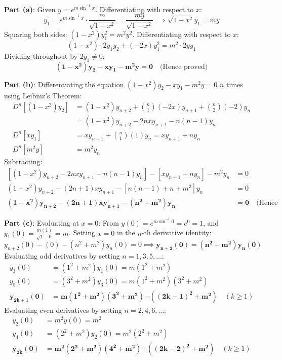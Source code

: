 \begin{solutionbox}
\textbf{Part (a)}: Given $y = e^{m\sin^{-1}x}$. Differentiating with respect to $x$:
\begin{equation*}
    y_1 = e^{m\sin^{-1}x} \cdot \frac{m}{\sqrt{1-x^2}} = \frac{m y}{\sqrt{1-x^2}} \implies \sqrt{1-x^2} y_1 = m y
\end{equation*}
Squaring both sides: $(1-x^2)y_1^2 = m^2 y^2$. Differentiating with respect to $x$:
\begin{equation*}
    (1-x^2) \cdot 2y_1 y_2 + (-2x)y_1^2 = m^2 \cdot 2y y_1
\end{equation*}
Dividing throughout by $2y_1 \ne 0$:
\begin{equation*}
    \mathbf{(1-x^2)y_2 - x y_1 - m^2 y = 0} \quad \text{(Hence proved)}
\end{equation*}

\textbf{Part (b)}: Differentiating the equation $(1-x^2)y_2 - x y_1 - m^2 y = 0$ $n$ times using Leibniz's Theorem:
\begin{align*}
    D^n[(1-x^2)y_2] &= (1-x^2)y_{n+2} + \binom{n}{1}(-2x)y_{n+1} + \binom{n}{2}(-2)y_n \\
    &= (1-x^2)y_{n+2} - 2nx y_{n+1} - n(n-1)y_n \\
    D^n[x y_1] &= x y_{n+1} + \binom{n}{1}(1)y_n = x y_{n+1} + n y_n \\
    D^n[m^2 y] &= m^2 y_n
\end{align*}
Subtracting:
\begin{align*}
    \left[(1-x^2)y_{n+2} - 2nx y_{n+1} - n(n-1)y_n\right] - \left[x y_{n+1} + n y_n\right] - m^2 y_n &= 0 \\
    (1-x^2)y_{n+2} - (2n+1)x y_{n+1} - [n(n-1) + n + m^2]y_n &= 0 \\
    \mathbf{(1-x^2)y_{n+2} - (2n+1)x y_{n+1} - (n^2+m^2)y_n} &= \mathbf{0} \quad \text{(Hence proved)}
\end{align*}

\textbf{Part (c)}: Evaluating at $x = 0$:
From $y(0) = e^{m\sin^{-1}0} = e^0 = 1$, and $y_1(0) = \frac{m(1)}{\sqrt{1-0}} = m$.
Setting $x = 0$ in the $n$-th derivative identity:
\begin{equation*}
    y_{n+2}(0) - (0) - (n^2+m^2)y_n(0) = 0 \implies \mathbf{y_{n+2}(0) = (n^2+m^2)y_n(0)}
\end{equation*}
Evaluating odd derivatives by setting $n = 1, 3, 5, \dots$:
\begin{align*}
    y_3(0) &= (1^2+m^2)y_1(0) = m(1^2+m^2) \\
    y_5(0) &= (3^2+m^2)y_3(0) = m(1^2+m^2)(3^2+m^2) \\
    \mathbf{y_{2k+1}(0)} &= \mathbf{m(1^2+m^2)(3^2+m^2)\cdots((2k-1)^2+m^2)} \quad (k \ge 1)
\end{align*}
Evaluating even derivatives by setting $n = 2, 4, 6, \dots$:
\begin{align*}
    y_2(0) &= m^2 y(0) = m^2 \\
    y_4(0) &= (2^2+m^2)y_2(0) = m^2(2^2+m^2) \\
    \mathbf{y_{2k}(0)} &= \mathbf{m^2(2^2+m^2)(4^2+m^2)\cdots((2k-2)^2+m^2)} \quad (k \ge 1)
\end{align*}
\end{solutionbox}

